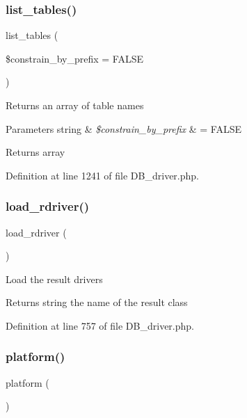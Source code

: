 \subsubsection{\texorpdfstring{list\_tables()}{list\_tables()}}
{\footnotesize\ttfamily list\+\_\+tables (\begin{DoxyParamCaption}\item[{}]{\$constrain\+\_\+by\+\_\+prefix = {\ttfamily FALSE} }\end{DoxyParamCaption})}

Returns an array of table names


\begin{DoxyParams}[1]{Parameters}
string & {\em \$constrain\+\_\+by\+\_\+prefix} & = F\+A\+L\+SE \\
\hline
\end{DoxyParams}
\begin{DoxyReturn}{Returns}
array 
\end{DoxyReturn}


Definition at line 1241 of file D\+B\+\_\+driver.\+php.

\mbox{\label{class_c_i___d_b__driver_a0bd509a0088f09f4bbfbcbbe78bc3547}} 
\subsubsection{\texorpdfstring{load\_rdriver()}{load\_rdriver()}}
{\footnotesize\ttfamily load\+\_\+rdriver (\begin{DoxyParamCaption}{ }\end{DoxyParamCaption})}

Load the result drivers

\begin{DoxyReturn}{Returns}
string the name of the result class 
\end{DoxyReturn}


Definition at line 757 of file D\+B\+\_\+driver.\+php.

\mbox{\label{class_c_i___d_b__driver_ad69bddb2ba31b27415484b3da4213ba8}} 
\subsubsection{\texorpdfstring{platform()}{platform()}}
{\footnotesize\ttfamily platform (\begin{DoxyParamCaption}{ }\end{DoxyParamCaption})}

